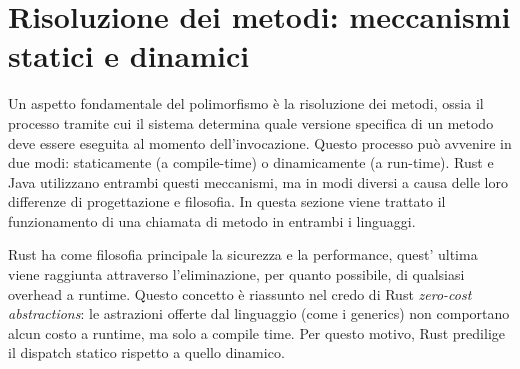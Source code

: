 \section{Risoluzione dei metodi: meccanismi statici e dinamici}
Un aspetto fondamentale del polimorfismo è la risoluzione dei metodi, ossia il processo tramite cui il sistema determina quale versione specifica di un metodo deve essere eseguita al momento dell'invocazione. Questo processo può avvenire in due modi: staticamente (a compile-time) o dinamicamente (a run-time). Rust e Java utilizzano entrambi questi meccanismi, ma in modi diversi a causa delle loro differenze di progettazione e filosofia. In questa sezione viene trattato il funzionamento di una chiamata di metodo in entrambi i linguaggi.

Rust ha come filosofia principale la sicurezza e la performance, quest' ultima viene raggiunta attraverso l'eliminazione, per quanto possibile, di qualsiasi overhead a runtime. Questo concetto è riassunto nel credo di Rust \textit{zero-cost abstractions}: le astrazioni offerte dal linguaggio (come i generics) non comportano alcun costo a runtime, ma solo a compile time. Per questo motivo, Rust predilige il dispatch statico rispetto a quello dinamico. 

